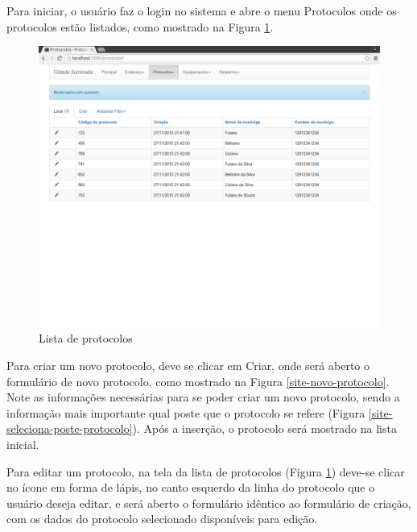 \documentclass[
	article,			%
	11pt,				%
	oneside,			%
	a4paper,			%
	english,			%
	brazil,				%
	sumario=tradicional
	]{abntex2}
\begin{document}
Para iniciar, o usuário faz o login no sistema e abre o menu Protocolos onde os protocolos estão listados, como
mostrado na Figura \ref{site-tela-inicial}.

\begin{figure}[!htbp]
 \centering
 \caption{\label{site-tela-inicial}Lista de protocolos}
 \includegraphics[scale=0.25]{site/1-lista_protocolos.png}
\end{figure}

\clearpage

Para criar um novo protocolo, deve se clicar em Criar, onde será aberto o formulário de novo
protocolo, como mostrado na Figura \ref{site-novo-protocolo}. Note as informações necessárias para
se poder criar um novo protocolo, sendo a informação mais importante qual poste que o protocolo se
refere (Figura \ref{site-seleciona-poste-protocolo}). Após a inserção, o protocolo será mostrado na lista inicial.

Para editar um protocolo, na tela da lista de protocolos (Figura \ref{site-tela-inicial}) deve-se
clicar no ícone em forma de lápis, no canto esquerdo da linha do protocolo que o usuário deseja editar,
e será aberto o formulário idêntico ao formulário de criação, com os dados do protocolo selecionado
disponíveis para edição.
\end{document}
